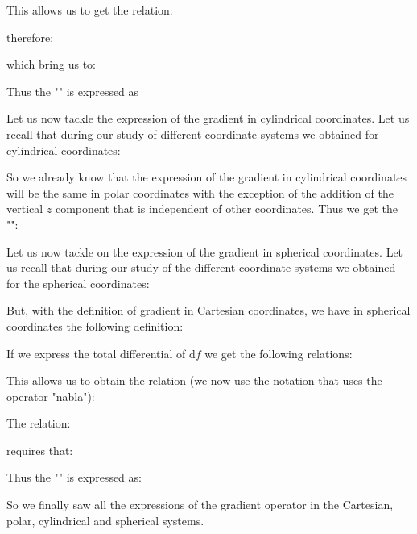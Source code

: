	This allows us to get the relation:
	
	therefore:
	
	which bring us to:
	
	Thus the "\label{gradient in polar coordinates}" is expressed as
	
	Let us now tackle the expression of the gradient in cylindrical coordinates. Let us recall that  during our study of different coordinate systems we obtained for cylindrical coordinates:
	
	So we already know that the expression of the gradient in cylindrical coordinates will be the same in polar coordinates with the exception of the addition of the vertical $z$ component that is independent of other coordinates. Thus we get the "":
	 
	Let us now tackle on the expression of the gradient in spherical coordinates. Let us recall that during our study of the different coordinate systems we obtained for the spherical coordinates:
	
	But, with the definition of gradient in Cartesian coordinates, we have in spherical coordinates the following definition:
	
	If we express the total differential of $\mathrm{d}f$ we get the following relations:
	
	This allows us to obtain the relation (we now use the notation that uses the operator "nabla"):
	
	The relation:
	
	requires that:
	
	Thus the "" is expressed as:
	 
	So we finally saw all the expressions of the gradient operator in the Cartesian, polar, cylindrical and spherical systems.
	
